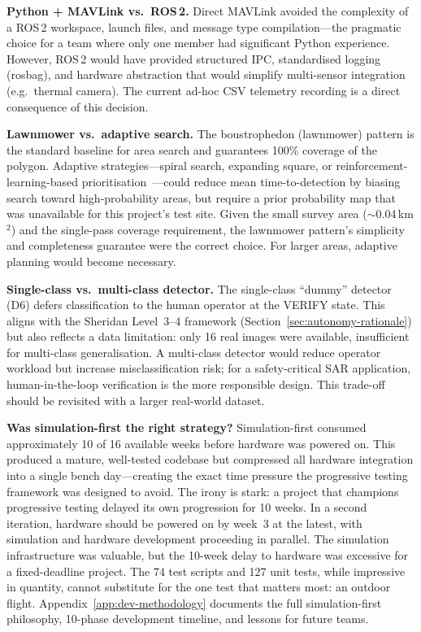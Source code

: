 \textbf{Python + MAVLink vs.\ ROS\,2.}
Direct MAVLink avoided the complexity of a ROS\,2 workspace, launch files, and message type compilation---the pragmatic choice for a team where only one member had significant Python experience. However, ROS\,2 would have provided structured IPC, standardised logging (rosbag), and hardware abstraction that would simplify multi-sensor integration (e.g.\ thermal camera). The current ad-hoc CSV telemetry recording is a direct consequence of this decision.

\textbf{Lawnmower vs.\ adaptive search.}
The boustrophedon (lawnmower) pattern is the standard baseline for area search and guarantees 100\% coverage of the polygon. Adaptive strategies---spiral search, expanding square, or reinforcement-learning-based prioritisation~\cite{deeprlsar2025}---could reduce mean time-to-detection by biasing search toward high-probability areas, but require a prior probability map that was unavailable for this project's test site. Given the small survey area (${\sim}$0.04\,km$^2$) and the single-pass coverage requirement, the lawnmower pattern's simplicity and completeness guarantee were the correct choice. For larger areas, adaptive planning would become necessary.

\textbf{Single-class vs.\ multi-class detector.}
The single-class ``dummy'' detector (D6) defers classification to the human operator at the VERIFY state. This aligns with the Sheridan Level~3--4 framework (Section~\ref{sec:autonomy-rationale}) but also reflects a data limitation: only 16 real images were available, insufficient for multi-class generalisation. A multi-class detector would reduce operator workload but increase misclassification risk; for a safety-critical SAR application, human-in-the-loop verification is the more responsible design. This trade-off should be revisited with a larger real-world dataset.

\textbf{Was simulation-first the right strategy?}
Simulation-first consumed approximately 10 of 16 available weeks before hardware was powered on. This produced a mature, well-tested codebase but compressed all hardware integration into a single bench day---creating the exact time pressure the progressive testing framework was designed to avoid. The irony is stark: a project that champions progressive testing delayed its own progression for 10 weeks. In a second iteration, hardware should be powered on by week~3 at the latest, with simulation and hardware development proceeding in parallel. The simulation infrastructure was valuable, but the 10-week delay to hardware was excessive for a fixed-deadline project. The 74 test scripts and 127 unit tests, while impressive in quantity, cannot substitute for the one test that matters most: an outdoor flight. Appendix~\ref{app:dev-methodology} documents the full simulation-first philosophy, 10-phase development timeline, and lessons for future teams.

